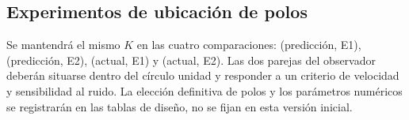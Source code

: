 \subsection{Experimentos de ubicación de polos}
Se mantendrá el mismo \(K\) en las cuatro comparaciones:
(predicción, E1), (predicción, E2), (actual, E1) y (actual, E2).
Las dos parejas del observador deberán situarse dentro del círculo unidad
y responder a un criterio de velocidad y sensibilidad al ruido.
La elección definitiva de polos y los parámetros numéricos se registrarán
en las tablas de diseño, no se fijan en esta versión inicial.
